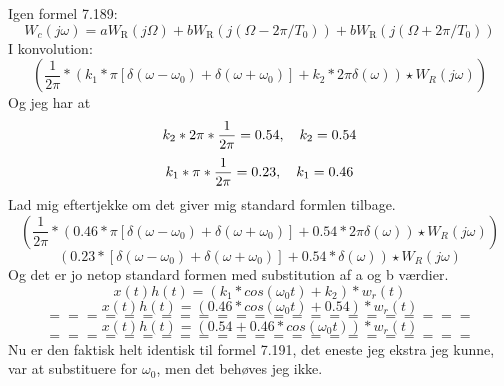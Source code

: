 \begin{Opgaver}
\begin{kapitel}
\begin{Opgave}
            \begin{UnderOpgave}[For the choice of \text{$a = 0.54, b = 0.23$} and using ICTFT show that the resulting
                Hamming window function is given by eq. 7.191]
                Igen formel 7.189: 
                \[W_c(j\omega)=a W_{\mathrm{R}}(j\Omega)+b W_{\mathrm{R}}(j(\Omega-2\pi/T_{0}))+b W_{\mathrm{R}}(j(\Omega+2\pi/T_{0}))\]
                I konvolution: 
                \[(\frac{1}{2\pi} * (k_1 * \pi[\delta(\omega - \omega_0) + \delta(\omega + \omega_0)] + k_2 * 2\pi\delta(\omega))\star W_R(j\omega))\]
                Og jeg har at 
                \[k_2 * 2\pi * \frac{1}{2\pi} = 0.54, \tab{0} k_2 = 0.54\]
                \[k_1 * \pi * \frac{1}{2\pi} = 0.23, \tab{0} k_1 = 0.46\]
                Lad mig eftertjekke om det giver mig standard formlen tilbage. 
                \[(\frac{1}{2\pi} * (0.46 * \pi[\delta(\omega - \omega_0) + \delta(\omega + \omega_0)] + 0.54 * 2\pi\delta(\omega))\star W_R(j\omega))\]
                \[(0.23 * [\delta(\omega - \omega_0) + \delta(\omega + \omega_0)] + 0.54 * \delta(\omega))\star W_R(j\omega)\]
                Og det er jo netop standard formen med substitution af a og b værdier.
                \[x(t)h(t) = (k_1 * cos(\omega_0 t) + k_2) * w_r(t) \]
                \[x(t)h(t) = (0.46 * cos(\omega_0 t) + 0.54) * w_r(t) \]
                \[=======================\]
                \[x(t)h(t) = (0.54 + 0.46 * cos(\omega_0 t)) * w_r(t) \]
                \[=======================\]
                Nu er den faktisk helt identisk til formel 7.191, det eneste jeg ekstra jeg kunne, var at substituere for $\omega_0$, men det behøves jeg ikke. 



\end{UnderOpgave}
\end{Opgave}
\end{kapitel}
\end{Opgaver}
